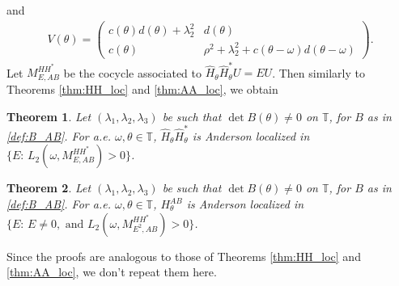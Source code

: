 \documentclass[11pt]{amsart}
\newtheorem{theorem}{Theorem}[section]
\newcommand{\T}{\mathbb T}
\begin{document}
and
\begin{align}
    V(\theta)=
    \left(\begin{matrix}
        c(\theta)d(\theta)+\lambda_2^2 &d(\theta)\\
        c(\theta) &\rho^2+\lambda_2^2+c(\theta-\omega)d(\theta-\omega)
    \end{matrix}\right).
\end{align}
Let $M_{E,AB}^{HH^*}$ be the cocycle associated to $\widehat{H}_{\theta}\widehat{H}_{\theta}^*U=EU$. 
Then similarly to Theorems \ref{thm:HH_loc} and \ref{thm:AA_loc},  we obtain 
\begin{theorem}\label{thm:HH_loc_2}
    Let $(\lambda_1,\lambda_2,\lambda_3)$ be such that $\det B(\theta)\neq 0$ on $\T$, for $B$ as in \eqref{def:B_AB}.
    For a.e. $\omega,\theta\in \T$, $\widehat{H}_{\theta}\widehat{H}_{\theta}^*$ is Anderson localized in $\{E:\, L_2(\omega, M_{E,AB}^{HH^*})>0\}$.
\end{theorem}
\begin{theorem}\label{thm:AB_loc}
    Let $(\lambda_1,\lambda_2,\lambda_3)$ be such that $\det B(\theta)\neq 0$ on $\T$, for $B$ as in \eqref{def:B_AB}.
    For a.e. $\omega,\theta\in \T$, $H_{\theta}^{AB}$ is Anderson localized in $\{E:\, E\neq 0, \text{ and }  L_2(\omega,M_{E^2,AB}^{HH^*})>0\}$.
\end{theorem}
Since the proofs are analogous to those of Theorems \ref{thm:HH_loc} and \ref{thm:AA_loc}, we don't repeat them here.
\end{document}
